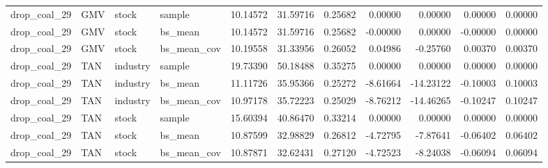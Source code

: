 \begin{tabular}{llllrrrrrrr}
drop\_coal\_29 & GMV & stock & sample & 10.14572 & 31.59716 & 0.25682 & 0.00000 & 0.00000 & 0.00000 & 0.00000 \\
drop\_coal\_29 & GMV & stock & bs\_mean & 10.14572 & 31.59716 & 0.25682 & -0.00000 & 0.00000 & -0.00000 & 0.00000 \\
drop\_coal\_29 & GMV & stock & bs\_mean\_cov & 10.19558 & 31.33956 & 0.26052 & 0.04986 & -0.25760 & 0.00370 & 0.00370 \\
drop\_coal\_29 & TAN & industry & sample & 19.73390 & 50.18488 & 0.35275 & 0.00000 & 0.00000 & 0.00000 & 0.00000 \\
drop\_coal\_29 & TAN & industry & bs\_mean & 11.11726 & 35.95366 & 0.25272 & -8.61664 & -14.23122 & -0.10003 & 0.10003 \\
drop\_coal\_29 & TAN & industry & bs\_mean\_cov & 10.97178 & 35.72223 & 0.25029 & -8.76212 & -14.46265 & -0.10247 & 0.10247 \\
drop\_coal\_29 & TAN & stock & sample & 15.60394 & 40.86470 & 0.33214 & 0.00000 & 0.00000 & 0.00000 & 0.00000 \\
drop\_coal\_29 & TAN & stock & bs\_mean & 10.87599 & 32.98829 & 0.26812 & -4.72795 & -7.87641 & -0.06402 & 0.06402 \\
drop\_coal\_29 & TAN & stock & bs\_mean\_cov & 10.87871 & 32.62431 & 0.27120 & -4.72523 & -8.24038 & -0.06094 & 0.06094 \\
\bottomrule
\end{tabular}

